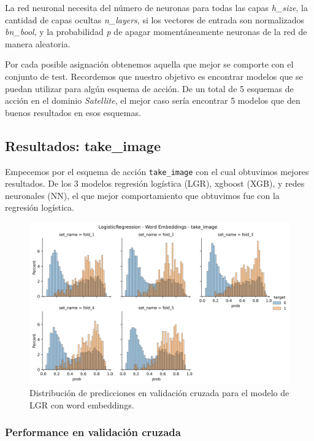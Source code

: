 La red neuronal necesita del número de neuronas para todas las capas
\emph{h\_size}, la cantidad de capas ocultas \emph{n\_layers}, si los vectores
de entrada son normalizados \emph{bn\_bool}, y la probabilidad  \emph{p} de
apagar momentáneamente neuronas de la red de manera aleatoria.

Por cada posible asignación obtenemos aquella que mejor se comporte con el
conjunto de test. Recordemos que nuestro objetivo es encontrar modelos que se
puedan utilizar para algún esquema de acción. De un total de 5 esquemas de acción
en el dominio \emph{Satellite}, el mejor caso sería encontrar 5 modelos que den
buenos resultados en esos esquemas.

\subsection{Resultados: take\_image}

Empecemos por el esquema de acción \verb|take_image| con el cual obtuvimos
mejores resultados. De los 3 modelos regresión logística (LGR), xgboost (XGB), y
redes neuronales (NN), el que mejor comportamiento que obtuvimos fue con la
regresión logística. 

\begin{figure}[t!]
    \centering
    \includegraphics[width=\linewidth]{figures/results/word_embeddings/lgr/take_image/lgr_wb_take_image.png}
    \caption{Distribución de predicciones en validación cruzada para el modelo de LGR con word embeddings.}
    \label{fig:takeimage-bestmodel-distplot}
\end{figure}

\subsubsection{Performance en validación cruzada}

